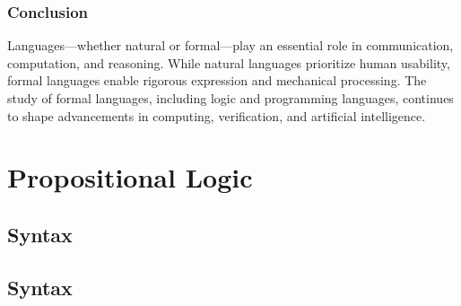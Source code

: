 \documentclass{book}
\begin{document}
\hypertarget{pandoc.profile.debug__pandoc__debug__src__languages.md__conclusion}{%
\subsection*{Conclusion}\label{pandoc.profile.debug__pandoc__debug__src__languages.md__conclusion}}

Languages---whether natural or formal---play an essential role in communication, computation, and reasoning. While natural languages prioritize human usability, formal languages enable rigorous expression and mechanical processing. The study of formal languages, including logic and programming languages, continues to shape advancements in computing, verification, and artificial intelligence.

\hypertarget{pandoc.profile.debug__pandoc__debug__src__proplogic.md}{}
\hypertarget{pandoc.profile.debug__pandoc__debug__src__proplogic.md__propositional-logic}{%
\chapter{Propositional Logic}\label{pandoc.profile.debug__pandoc__debug__src__proplogic.md__propositional-logic}}

\hypertarget{pandoc.profile.debug__pandoc__debug__src__dmt1__lectures__l02_proplogic__formal__syntax.lean.md}{}
\hypertarget{pandoc.profile.debug__pandoc__debug__src__dmt1__lectures__l02_proplogic__formal__syntax.lean.md__syntax}{%
\section{Syntax}\label{pandoc.profile.debug__pandoc__debug__src__dmt1__lectures__l02_proplogic__formal__syntax.lean.md__syntax}}

\hypertarget{pandoc.profile.debug__pandoc__debug__src__dmt1__library__proplogic__syntax.lean.md}{}
\hypertarget{pandoc.profile.debug__pandoc__debug__src__dmt1__library__proplogic__syntax.lean.md__syntax}{%
\section{Syntax}\label{pandoc.profile.debug__pandoc__debug__src__dmt1__library__proplogic__syntax.lean.md__syntax}}
\end{document}
